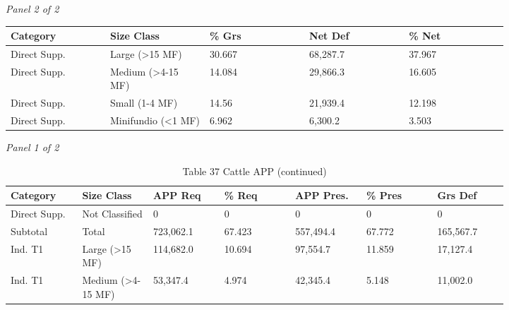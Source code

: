 \documentclass[12pt]{article}
\begin{document}
\begin{landscape}
\begin{table}[H]
\textit{Panel 2 of 2}\\[2pt]
{\fontsize{12}{14}\selectfont
\setlength{\tabcolsep}{3pt}
\renewcommand{\arraystretch}{1.08}
\begin{tabular}{p{0.164\linewidth}p{0.164\linewidth}p{0.164\linewidth}p{0.164\linewidth}p{0.164\linewidth}}
\toprule
Category & Size Class & \% Grs & Net Def & \% Net \\
\midrule
Direct Supp. & Large (>15 MF) & 30.667 & 68,287.7 & 37.967 \\
Direct Supp. & Medium (>4-15 MF) & 14.084 & 29,866.3 & 16.605 \\
Direct Supp. & Small (1-4 MF) & 14.56 & 21,939.4 & 12.198 \\
Direct Supp. & Minifundio (<1 MF) & 6.962 & 6,300.2 & 3.503 \\
\bottomrule
\end{tabular}
}
\end{table}
\begin{table}[H]
\centering
\caption{Table 37 Cattle APP (continued)}
\textit{Panel 1 of 2}\\[2pt]
{\fontsize{12}{14}\selectfont
\setlength{\tabcolsep}{3pt}
\renewcommand{\arraystretch}{1.08}
\begin{tabular}{p{0.117\linewidth}p{0.117\linewidth}p{0.117\linewidth}p{0.117\linewidth}p{0.117\linewidth}p{0.117\linewidth}p{0.117\linewidth}}
\toprule
Category & Size Class & APP Req & \% Req & APP Pres. & \% Pres & Grs Def \\
\midrule
Direct Supp. & Not Classified & 0 & 0 & 0 & 0 & 0 \\
Subtotal & Total & 723,062.1 & 67.423 & 557,494.4 & 67.772 & 165,567.7 \\
Ind. T1 & Large (>15 MF) & 114,682.0 & 10.694 & 97,554.7 & 11.859 & 17,127.4 \\
Ind. T1 & Medium (>4-15 MF) & 53,347.4 & 4.974 & 42,345.4 & 5.148 & 11,002.0 \\
\bottomrule
\end{tabular}
}

\vspace{0.6em}


\end{table}
\end{landscape}
\end{document}
